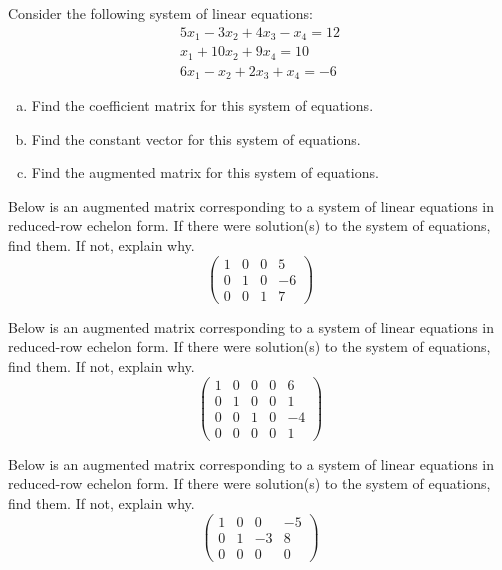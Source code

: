 \documentclass[12pt,letterpaper]{exam}
\begin{document}
\begin{questions}
\newpage
\question[10] Consider the following system of linear equations:
	\[
	\begin{aligned}
	5x_1 - 3x_2 + 4x_3 - x_4= 12 \\
	x_1 + 10x_2 + 9x_4= 10 \\
	6x_1 - x_2 + 2x_3 + x_4= -6
	\end{aligned}
	\]

\begin{enumerate}[(a)]
\item Find the coefficient matrix for this system of equations. 
\item Find the constant vector for this system of equations.
\item Find the augmented matrix for this system of equations. 
\end{enumerate}



\newpage
\question[10] Below is an augmented matrix corresponding to a system of linear equations in reduced-row echelon form. If there were solution(s) to the system of equations, find them. If not, explain why. 
	\[
	\begin{pmatrix}
	1 & 0 & 0 & 5 \\
	0 & 1 & 0 & -6 \\
	0 & 0 & 1 & 7
	\end{pmatrix}	
	\]



\newpage
\question[10] Below is an augmented matrix corresponding to a system of linear equations in reduced-row echelon form. If there were solution(s) to the system of equations, find them. If not, explain why. 
	\[
	\begin{pmatrix}
	1 & 0 & 0 & 0 & 6 \\
	0 & 1 & 0 & 0 & 1 \\
	0 & 0 & 1 & 0 & -4 \\
	0 & 0 & 0 & 0 & 1 
	\end{pmatrix}	
	\]



\newpage
\question[10] Below is an augmented matrix corresponding to a system of linear equations in reduced-row echelon form. If there were solution(s) to the system of equations, find them. If not, explain why. 
	\[
	\begin{pmatrix}
	1 & 0 & 0 & -5 \\
	0 & 1 & -3 & 8 \\
	0 & 0 & 0 & 0
	\end{pmatrix}	
	\]




\end{questions}
\end{document}
